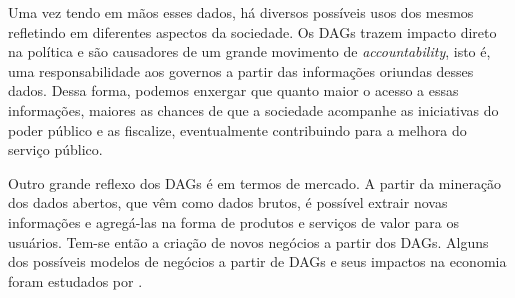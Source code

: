 Uma vez tendo em mãos esses dados, há diversos possíveis usos dos mesmos refletindo em diferentes aspectos da sociedade. Os DAGs trazem impacto direto na política e são causadores de um grande movimento de \textit{accountability}, isto é, uma responsabilidade aos governos a partir das informações oriundas desses dados. Dessa forma, podemos enxergar que quanto maior o acesso a essas informações, maiores as chances de que a sociedade acompanhe as iniciativas do poder público e as fiscalize, eventualmente contribuindo para a melhora do serviço público.

Outro grande reflexo dos DAGs é em termos de mercado. A partir da mineração dos dados abertos, que vêm como dados brutos, é possível extrair novas informações e agregá-las na forma de  produtos e serviços de valor para os usuários. Tem-se então a criação de novos negócios a partir dos DAGs. Alguns dos possíveis modelos de negócios a partir de DAGs e seus impactos na economia foram estudados por \cite{REF_MONO_BUUS}. 